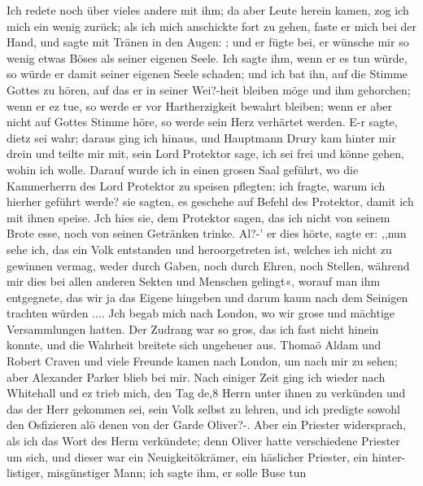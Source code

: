 Ich redete noch über vieles andere mit ihm; da aber Leute herein
kamen, zog ich mich ein wenig zurück; als ich mich anschickte fort
zu gehen, faste er mich bei der Hand, und sagte mit Tränen in
den Augen: ; und er fügte bei, er wünsche mir so wenig etwas
Böses als seiner eigenen Seele. Ich sagte ihm, wenn er es tun
würde, so würde er damit seiner eigenen Seele schaden; und ich
bat ihn, auf die Stimme Gottes zu hören, auf das er in seiner
Wei?-heit bleiben möge und ihm gehorchen; wenn er ez tue, so
werde er vor Hartherzigkeit bewahrt bleiben; wenn er aber
nicht auf Gottes Stimme höre, so werde sein Herz verhärtet
werden. E-r sagte, dietz sei wahr; daraus ging ich hinaus, und
Hauptmann Drury kam hinter mir drein und teilte mir mit, sein
Lord Protektor sage, ich sei frei und könne gehen, wohin ich
wolle. Darauf wurde ich in einen grosen Saal geführt, wo
die Kammerherrn des Lord Protektor zu speisen pflegten; ich fragte,
warum ich hierher geführt werde? sie sagten, es geschehe auf
Befehl des Protektor, damit ich mit ihnen speise. Jch hies sie,
dem Protektor sagen, das ich nicht von seinem Brote esse, noch
von seinen Getränken trinke. Al?-’ er dies hörte, sagte er: ,,nun
sehe ich, das ein Volk entstanden und heroorgetreten ist, welches
ich nicht zu gewinnen vermag, weder durch Gaben, noch durch
Ehren, noch Stellen, während mir dies bei allen anderen Sekten
und Menschen gelingt«, worauf man ihm entgegnete, das wir
ja das Eigene hingeben und darum kaum nach dem Seinigen
trachten würden ....
Jch begab mich nach London, wo wir grose und mächtige
Versammlungen hatten. Der Zudrang war so gros, das ich fast
nicht hinein konnte, und die Wahrheit breitete sich ungeheuer aus.
Thomaö Aldam und Robert Craven und viele Freunde kamen
nach London, um nach mir zu sehen; aber Alexander Parker
blieb bei mir.
Nach einiger Zeit ging ich wieder nach Whitehall und ez
trieb mich, den Tag de,8 Herrn unter ihnen zu verkünden und
das der Herr gekommen sei, sein Volk selbst zu lehren, und ich
predigte sowohl den Osfizieren alö denen von der Garde Oliver?-.
Aber ein Priester widersprach, als ich das Wort des Herm
verkündete; denn Oliver hatte verschiedene Priester um sich, und
dieser war ein Neuigkeitökrämer, ein häslicher Priester, ein hinter-
listiger, misgünstiger Mann; ich sagte ihm, er solle Buse tun


